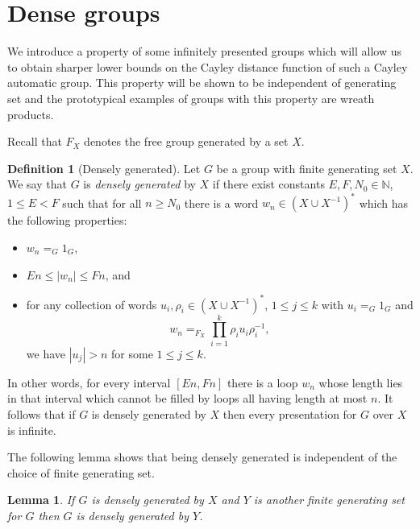 \documentclass[11pt]{amsart}
\newtheorem{lemma}[theorem]{Lemma}
\theoremstyle{definition}
\newtheorem{definition}[theorem]{Definition}
\newcommand\N{\mathbb N}
\renewcommand{\geq}{\geqslant} \renewcommand{\leq}{\leqslant} \renewcommand{\ge}{\geqslant} \renewcommand{\le}{\leqslant}
\begin{document}
\section{Dense groups}\label{sec:dense}

We introduce a property of some infinitely presented groups which will allow us to obtain sharper lower bounds on the Cayley distance function of such a Cayley automatic group.
This property will be shown to be independent of generating set and the prototypical examples of groups with this property are wreath products.

Recall that  $F_X$ denotes the free group generated by a set $X$.

\begin{definition}[Densely generated]
\label{def:dense}
Let $G$ be a group with finite  generating set  $X$.
We say that $G$ is   {\em densely generated} by $X$
if  there exist  constants $E,F, N_0\in \N$,
 $1\leq E<F$
such that  for all $n\geq N_0$ there is a word $w_n\in (X\cup X^{-1})^*$ which has the following properties:
 \begin{itemize}[itemsep=5pt]
 \item $w_n=_G1_G$,
 \item $En\leq |w_n|\leq Fn$, and
 \item for any collection of words $u_i,\rho_i\in (X\cup X^{-1})^*$,   $1 \leq j \leq k$ with $u_i=_G1_G$ and
 \[ w_n=_{F_X}\prod_{i=1}^k\rho_iu_i\rho_i^{-1}, \]
 we have $|u_j|>n$ for some  $1 \leq j \leq k$.
 \end{itemize} \end{definition}
In other words, for every interval $[En,Fn]$ there is a loop $w_n$ whose length lies in that interval which  cannot be {filled} by loops all having length at most $n$.
It follows that if $G$ is densely generated by $X$ then every presentation for $G$ over $X$ is infinite.

The following lemma shows that being densely generated is independent of the choice of finite generating set.


\begin{lemma}\label{lem:denseGsetInvariant} If $G$ is {densely generated} by $X$ and $Y$ is another finite generating set for $G$ then $G$ is {densely generated} by $Y$.\end{lemma}
\end{document}
